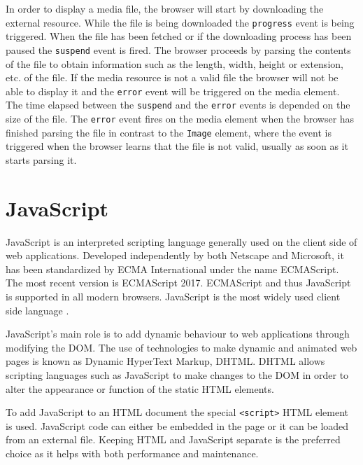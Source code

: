 \documentclass[10pt,a4paper,twoside]{book}
\begin{document}
In order to display a media file, the browser will start by downloading the external resource. While the file is being downloaded the \texttt{progress} event is being triggered. When the file has been fetched or if the downloading process has been paused the \texttt{suspend} event is fired. The browser proceeds by parsing the contents of the file to obtain information such as the length, width, height or extension, etc. of the file. If the media resource is not a valid file the browser will not be able to display it and the \texttt{error} event will be triggered on the media element. The time elapsed between the \texttt{suspend} and the \texttt{error} events is depended on the size of the file. The \texttt{error} event fires on the media element when the browser has finished parsing the file in contrast to the \texttt{Image} element, where the event is triggered when the browser learns that the file is not valid, usually as soon as it starts parsing it\cite{berjon2014html}.

\section{JavaScript}
JavaScript is an interpreted scripting language generally used on the client side of web applications. Developed independently by both Netscape and Microsoft, it has been standardized by ECMA International under the name ECMAScript.
The most recent version is ECMAScript 2017. ECMAScript and thus JavaScript is supported in all modern browsers. JavaScript is the most widely used client side language \cite{javascriptstats, javascriptabout}.

JavaScript's main role is to add dynamic behaviour to web applications through modifying the DOM. The use of technologies to make dynamic and animated web pages is known as Dynamic HyperText Markup, DHTML. DHTML allows scripting languages such as JavaScript to make changes to the DOM in order to alter the appearance or function of the static HTML elements.

To add JavaScript to an HTML document the special \texttt{<script>} HTML element is used. JavaScript code can either be embedded in the page or it can be loaded from an external file. Keeping HTML and JavaScript separate is the preferred choice as it helps with both performance and maintenance.


\end{document}
